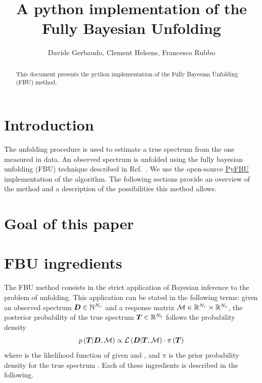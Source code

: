 \documentclass[a4paper]{article}
\title{A python implementation of the Fully Bayesian Unfolding}
\author{Davide Gerbaudo, Clement Helsens, Francesco Rubbo}
\begin{document}
\maketitle
\tableofcontents

\begin{abstract}
This document presents the python implementation of the Fully Bayesian Unfolding (FBU) method.
\end{abstract}

\section{Introduction}

The unfolding procedure is used to estimate a true spectrum
from the one measured in data. An observed spectrum is unfolded using
the fully bayesian unfolding (FBU) technique described in Ref.~\cite{Fbu2012arXiv1201.4612C}. 
We use the open-source \href{https://pypi.python.org/pypi/fbu}{PyFBU} 
implementation of the algorithm. 
The following sections provide an overview of the
method and a description of the possibilities this method allows.

\section{Goal of this paper}

\section{FBU ingredients}
The FBU method consists in the strict
application of Bayesian inference to the problem of unfolding. This
application can be stated in the following terms: given an observed
spectrum $\boldsymbol{D}\in\mathbb{N}^{N_r}$ and a response matrix
$\mathcal{M}\in\mathbb{R}{}^{N_r}\times{}\mathbb{R}{}^{N_t}$, the posterior
probability of the true spectrum $\boldsymbol{T}{}\in{}\mathbb{R}{}^{N_t}$ follows
the probability density
\begin{equation}
p\left(\boldsymbol{T}{}|\boldsymbol{D}{},\mathcal{M}{}\right)
\propto{}
\mathcal{L}\left(\boldsymbol{D}{}|\boldsymbol{T}{},\mathcal{M}{}\right)
\cdot{}
\pi{}\left(\boldsymbol{T}{}\right)
\end{equation}
where \conditionalLhood{\Data{}}{\Truth{},\TrasfMatrix{}} is the
likelihood function of \Data{} given \Truth{} and \TrasfMatrix{},
and $\pi{}$ is the prior probability density for the true spectrum
\Truth{}.
Each of these ingredients is described in the following.
\end{document}
